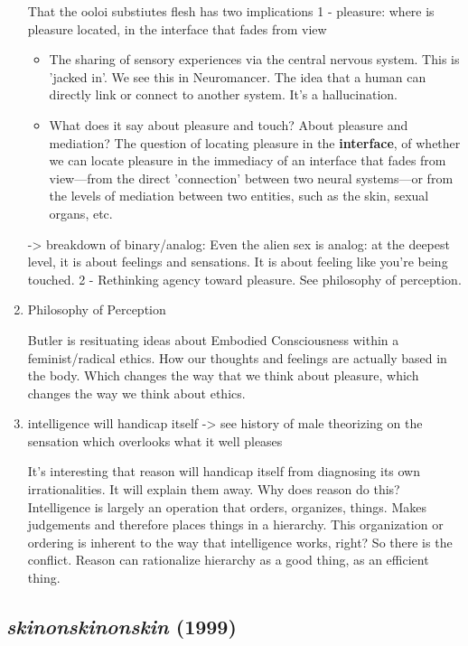 \documentclass[11pt]{article}
\begin{document}
\begin{enumerate}
That the ooloi substiutes flesh has two implications
1 - pleasure: where is pleasure located, in the interface that fades
  from view
\begin{itemize}
\item The sharing of sensory experiences via the central nervous
system.  This is 'jacked in'. We see this in Neuromancer. The
idea that a human can directly link or connect to another
system. It's a hallucination.
\item What does it say about pleasure and touch? About pleasure and
mediation? The question of locating pleasure in the \textbf{interface},
of whether we can locate pleasure in the immediacy of an
interface that fades from view---from the direct 'connection'
between two neural systems---or from the levels of mediation
between two entities, such as the skin, sexual organs, etc.
\end{itemize}
   -> breakdown of binary/analog: Even the alien sex is analog: at the
      deepest level, it is about feelings and sensations. It is about
      feeling like you're being touched.  
2 - Rethinking agency toward pleasure. See philosophy of perception.

\item Philosophy of Perception
\label{sec:org4cf2ea2}

Butler is resituating ideas about Embodied Consciousness within a
feminist/radical ethics. How our thoughts and feelings are actually
based in the body. Which changes the way that we think about pleasure,
which changes the way we think about ethics. 

\item intelligence will handicap itself -> see history of male
\label{sec:orgdd5c421}
theorizing on the sensation which overlooks what it well pleases

It's interesting that reason will handicap itself from diagnosing its
own irrationalities. It will explain them away. Why does reason do
this?  Intelligence is largely an operation that orders, organizes,
things. Makes judgements and therefore places things in a
hierarchy. This organization or ordering is inherent to the way that
intelligence works, right? So there is the conflict. Reason can
rationalize hierarchy as a good thing, as an efficient thing.
\end{enumerate}


\subsection{\emph{skinonskinonskin} (1999)}
\label{sec:org4f0342e}
\end{document}
